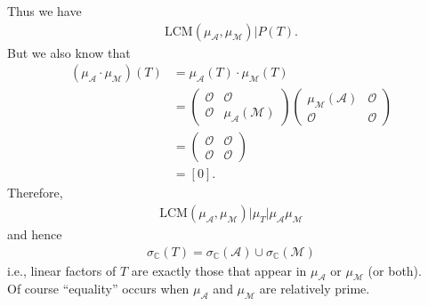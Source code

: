 \documentclass{article}
\theoremstyle{definition}
\newcommand{\A}{\mathcal{A}}
\newcommand{\M}{\mathcal{M}}
\begin{document}
Thus we have 
\begin{align*}
\text{LCM}(\mu_\A,\mu_\M) \big\vert P(T).
\end{align*}
But we also know that 
\begin{align*}
(\mu_\A \cdot \mu_\M)(T) &= \mu_\A (T) \cdot \mu_\M(T)\\
&= \begin{pmatrix}
\mathcal{O} & \mathcal{O}\\
\mathcal{O} & \mu_\A(\M)
\end{pmatrix}
\begin{pmatrix}
\mu_\M(\A) & \mathcal{O}\\
\mathcal{O} & \mathcal{O}
\end{pmatrix}\\
&=
\begin{pmatrix}
\mathcal{O} & \mathcal{O}\\
\mathcal{O} & \mathcal{O}
\end{pmatrix}\\
&= [0].
\end{align*}
Therefore,
\begin{align*}
\boxed{\text{LCM}(\mu_\A, \mu_\M) \big\vert \mu_T \big\vert \mu_\A \mu_\M}
\end{align*}
and hence
\begin{align*}
\boxed{\sigma_{\mathbb{C}}(T) =  \sigma_{\mathbb{C}}(\A) \cup \sigma_{\mathbb{C}}(\M)  }
\end{align*}
i.e., linear factors of $T$ are exactly those that appear in $\mu_\A$ or $\mu_\M$ (or both). \\

Of course ``equality'' occurs when $\mu_\A$ and $\mu_\M$ are relatively prime. 
\end{document}
